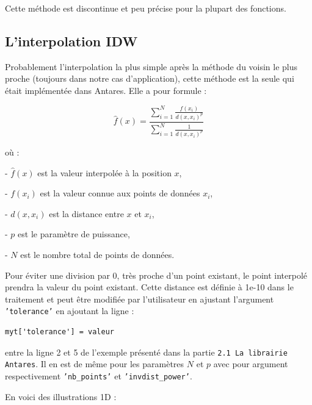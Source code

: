 \vspace{0.5cm}

Cette méthode est discontinue et peu précise pour la plupart des fonctions.



\subsection{L'interpolation \ac{IDW}} %

Probablement l'interpolation la plus simple après la méthode du voisin le plus proche (toujours dans notre cas d'application), cette méthode est la seule qui était implémentée dans Antares. Elle a pour formule :

\[
\hat{f}(x) = \frac{\sum_{i=1}^{N} \frac{f(x_i)}{d(x, x_i)^p}}{\sum_{i=1}^{N} \frac{1}{d(x, x_i)^p}}
\]

où :

- \(\hat{f}(x)\) est la valeur interpolée à la position \(x\),

- \(f(x_i)\) est la valeur connue aux points de données \(x_i\),

- \(d(x, x_i)\) est la distance entre \(x\) et \(x_i\),

- \(p\) est le paramètre de puissance,

- \(N\) est le nombre total de points de données.

\vspace*{0,5cm}

Pour éviter une division par 0, très proche d'un point existant, le point interpolé prendra la valeur du point existant. Cette distance est définie à 1e-10 dans le traitement et peut être modifiée par l'utilisateur en ajustant l'argument \texttt{'tolerance'} en ajoutant la ligne :
\begin{lstlisting}[]
    myt['tolerance'] = valeur
\end{lstlisting}
entre la ligne 2 et 5 de l'exemple présenté dans la partie \texttt{2.1 La librairie Antares}.
Il en est de même pour les paramètres \(N\) et \(p\) avec pour argument respectivement \texttt{'nb\_points'} et \texttt{'invdist\_power'}.


\vspace*{0,5cm}

\newpage

En voici des illustrations 1D :

